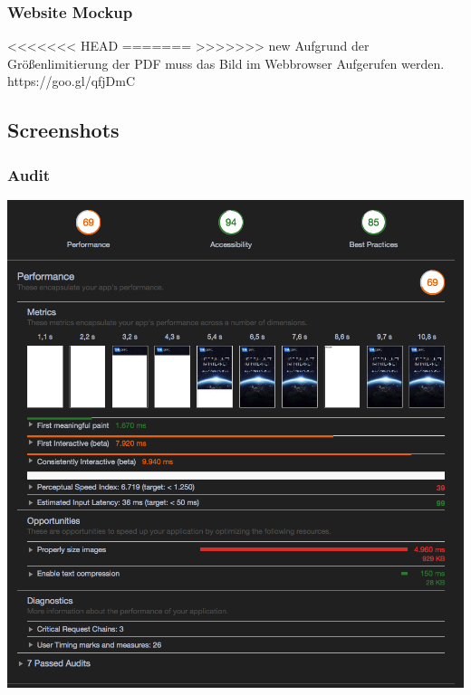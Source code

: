 \documentclass[11pt,a4paper]{article}
\begin{document}
\begin{appendices}
\subsubsection{Website Mockup}
<<<<<<< HEAD
=======
\label{sec:mockup}
>>>>>>> new
\centering
Aufgrund der Größenlimitierung der PDF muss das Bild im Webbrowser Aufgerufen werden.\\
https://goo.gl/qfjDmC
\flushleft


\subsection{Screenshots}
\subsubsection{Audit}
\label{sec:audit}
\includegraphics[scale=0.5]{audit}

\end{appendices}
\end{document}
